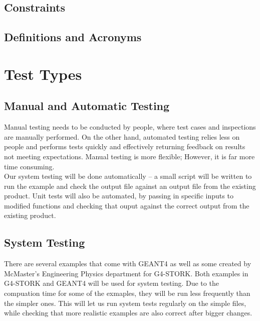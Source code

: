 \documentclass[12pt]{article}
\begin{document}
\subsection{Constraints} %

\subsection{Definitions and Acronyms} %

\section{Test Types}

\subsection{Manual and Automatic Testing} %
Manual testing needs to be conducted by people, where test cases and inspections are manually performed. On the other hand, automated testing relies less on people and performs tests quickly and effectively returning feedback on results not meeting expectations. Manual testing is more flexible; However, it is far more time consuming.\\

Our system testing will be done automatically -- a small script will be written to run the example and check the output file against an output file from the existing product. Unit tests will also be automated, by passing in specific inputs to modified functions and checking that ouput against the correct output from the existing product.\\ 

\subsection{System Testing} %
There are several examples that come with GEANT4 as well as some created by McMaster's Engineering Physics department for G4-STORK. Both examples in G4-STORK and GEANT4 will be used for system testing. Due to the compuation time for some of the exmaples, they will be run less frequently than the simpler ones. This will let us run system tests regularly on the simple files, while checking that more realistic examples are also correct after bigger changes.
\end{document}
